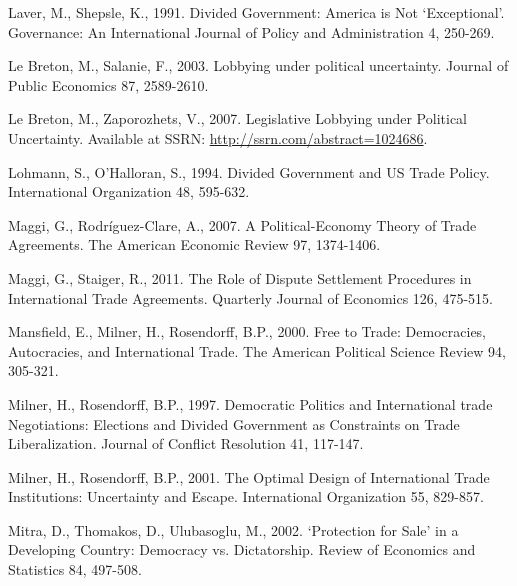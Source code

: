 \documentclass[10pt]{article}
\begin{document}
\begin{list}{}{\setlength{\leftmargin}{0.0in}\setlength{\rightmargin}{0.0in}\setlength{\itemindent}{0.0in}\setlength{\itemsep}{0.1in}}
\item Laver, M., Shepsle, K., 1991. Divided Government: America is Not `Exceptional'. Governance: An International Journal of Policy and Administration 4, 250-269.

\item Le Breton, M., Salanie, F., 2003. Lobbying under political uncertainty. Journal of Public Economics 87, 2589-2610.

\item Le Breton, M., Zaporozhets, V., 2007. Legislative Lobbying under Political Uncertainty. Available at SSRN: \url{http://ssrn.com/abstract=1024686}.

\item Lohmann, S., O'Halloran, S., 1994. Divided Government and US Trade Policy. International Organization 48, 595-632.

\item Maggi, G., Rodr\'{i}guez-Clare, A., 2007. A Political-Economy Theory of Trade Agreements. The American Economic Review 97, 1374-1406.

\item Maggi, G., Staiger, R., 2011. The Role of Dispute Settlement Procedures in International Trade Agreements. Quarterly Journal of Economics 126, 475-515.

\item Mansfield, E., Milner, H., Rosendorff, B.P., 2000. Free to Trade: Democracies, Autocracies, and International Trade. The American Political Science Review 94, 305-321.


\item Milner, H., Rosendorff, B.P., 1997. Democratic Politics and International trade Negotiations: Elections and Divided Government as Constraints on Trade Liberalization. Journal of Conflict Resolution 41, 117-147.

\item Milner, H., Rosendorff, B.P., 2001. The Optimal Design of International Trade Institutions: Uncertainty and Escape. International Organization 55, 829-857.

\item Mitra, D., Thomakos, D., Ulubasoglu, M., 2002. `Protection for Sale' in a Developing Country: Democracy vs. Dictatorship. Review of Economics and Statistics 84, 497-508.


\end{list}
\end{document}
